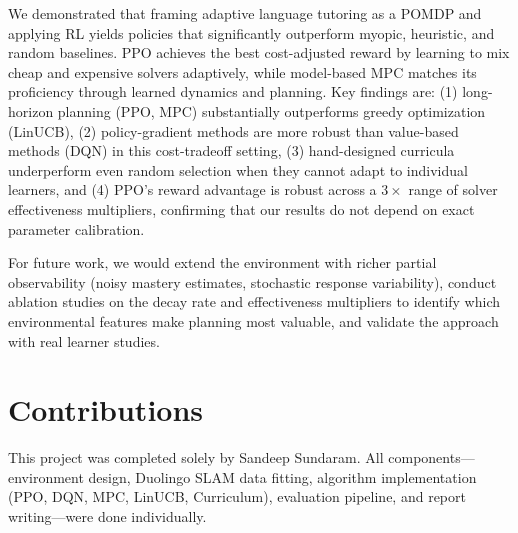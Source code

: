 \documentclass{article}
\begin{document}
We demonstrated that framing adaptive language tutoring as a POMDP and applying RL yields policies that significantly outperform myopic, heuristic, and random baselines. PPO achieves the best cost-adjusted reward by learning to mix cheap and expensive solvers adaptively, while model-based MPC matches its proficiency through learned dynamics and planning. Key findings are: (1) long-horizon planning (PPO, MPC) substantially outperforms greedy optimization (LinUCB), (2) policy-gradient methods are more robust than value-based methods (DQN) in this cost-tradeoff setting, (3) hand-designed curricula underperform even random selection when they cannot adapt to individual learners, and (4) PPO's reward advantage is robust across a $3\times$ range of solver effectiveness multipliers, confirming that our results do not depend on exact parameter calibration.

For future work, we would extend the environment with richer partial observability (noisy mastery estimates, stochastic response variability), conduct ablation studies on the decay rate and effectiveness multipliers to identify which environmental features make planning most valuable, and validate the approach with real learner studies.

\section{Contributions}
This project was completed solely by Sandeep Sundaram. All components---environment design, Duolingo SLAM data fitting, algorithm implementation (PPO, DQN, MPC, LinUCB, Curriculum), evaluation pipeline, and report writing---were done individually.



\end{document}

